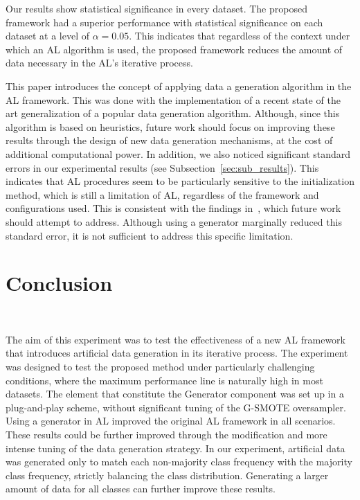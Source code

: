 \documentclass[remotesensing,article,submit,moreauthors,pdftex]{Definitions/mdpi}
\begin{document}
\begin{paracol}{2}
Our results show statistical significance in every dataset. The proposed
framework had a superior performance with statistical significance on each
dataset at a level of $\alpha = 0.05$. This indicates that regardless of the
context under which an AL algorithm is used, the proposed framework reduces
the amount of data necessary in the AL's iterative process.

This paper introduces the concept of applying data a generation algorithm in
the AL framework. This was done with the implementation of a recent state of
the art generalization of a popular data generation algorithm. Although, since
this algorithm is based on heuristics, future work should focus on improving
these results through the design of new data generation mechanisms, at the
cost of additional computational power. In addition, we also noticed
significant standard errors in our experimental results
(see Subsection~\ref{sec:sub_results}). This indicates that
AL procedures seem to be particularly sensitive to the initialization method,
which is still a limitation of AL, regardless of the framework and
configurations used. This is consistent with the findings
in~\cite{Kottke2017}, which future work should attempt to address. Although
using a generator marginally reduced this standard error, it is not sufficient
to address this specific limitation.

\section{Conclusion}~\label{sec:conclusion}

The aim of this experiment was to test the effectiveness of a new AL framework
that introduces artificial data generation in its iterative process. The
experiment was designed to test the proposed method under particularly
challenging conditions, where the maximum performance line is naturally high
in most datasets. The element that constitute the Generator component was set
up in a plug-and-play scheme, without significant tuning of the G-SMOTE
oversampler. Using a generator in AL improved the original AL framework in all
scenarios. These results could be further improved through the modification
and more intense tuning of the data generation strategy. In our experiment,
artificial data was generated only to match each non-majority class frequency
with the majority class frequency, strictly balancing the class distribution.
Generating a larger amount of data for all classes can further improve these
results. 


\end{paracol}
\end{document}
